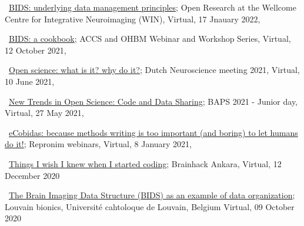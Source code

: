\textbullet~\href{https://osf.io/h6gsr/}{BIDS: underlying data management principles};
Open Research at the Wellcome Centre for Integrative Neuroimaging (WIN),
Virtual,
17 Jnauary 2022,

\textbullet~\href{https://remi-gau.github.io/bids_cookbook/}{BIDS: a cookbook};
ACCS and OHBM Webinar and Workshop Series,
Virtual,
12 October 2021,


\textbullet~\href{https://osf.io/ce7tn/}{Open science: what is it? why do it?};
Dutch Neuroscience meeting 2021,
Virtual,
10 June 2021,


\textbullet~\href{https://osf.io/6kzn2/}{New Trends in Open Science: Code and Data Sharing};
BAPS 2021 - Junior day,
Virtual,
27 May 2021,


\textbullet~\href{https://osf.io/fb7tx/}{eCobidas: because methods writing is too important (and boring) to let humans do it!};
Repronim webinars,
Virtual,
8 January 2021,


\textbullet~\href{https://osf.io/vdgua/}{Things I wish I knew when I started coding};
Brainhack Ankara,
Virtual,
12 December 2020


\textbullet~\href{https://osf.io/zf5x8/}{The Brain Imaging Data Structure (BIDS) as an example of data organization};
Louvain bionics, Université cahtoloque de Louvain, Belgium
Virtual,
09 October 2020
